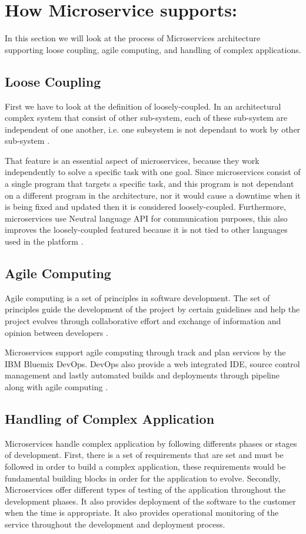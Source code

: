 \documentclass{IEEEtran}
\begin{document}
	\section{How Microservice supports:}
		In this section we will look at the process of Microservices architecture supporting loose coupling, agile computing, and handling of complex applications.  

		\subsection{Loose Coupling}
			First we have to look at the definition of loosely-coupled. In an architectural complex system that consist of other sub-system, each of these sub-system are independent of one another, i.e. one subsystem is not dependant to work by other sub-system \cite{mell2009effectively}. 
			\newline

			That feature is an essential aspect of microservices, because they work independently to solve a specific task with one goal. Since microservices consist of a single program that targets a specific task, and this program is not dependant on a different program in the architecture, nor it would cause a downtime when it is being fixed and updated then it is considered loosely-coupled. Furthermore, microservices use Neutral language API for communication purposes, this also improves the loosely-coupled featured because it is not tied to other languages used in the platform \cite{ibmred}. 
		\subsection{Agile Computing}
			Agile computing is a set of principles in software development. The set of principles guide the development of the project by certain guidelines and help the project evolves through collaborative effort and exchange of information and opinion between developers \cite{mell2009effectively}. 
			\newline

			Microservices support agile computing through track and plan services by the IBM Bluemix DevOps. 
			DevOps also provide a web integrated IDE, source control management and lastly automated builds and deployments through pipeline along with agile computing \cite{ibmred}. 

		\subsection{Handling of Complex Application}
			Microservices handle complex application by following differents phases or stages of development. First, there is a set of requirements that are set and must be followed in order to build a complex application, these requirements would be fundamental building blocks in order for the application to evolve. Secondly, Microservices offer different types of testing of the application throughout the development phases. It also provides deployment of the software to the customer when the time is appropriate. It also provides operational monitoring of the service throughout the development and deployment process. 
\end{document}
